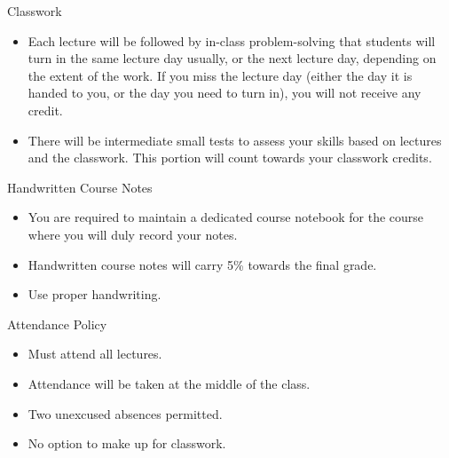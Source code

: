 \documentclass[aspectratio=169,xcolor=dvipsnames,svgnames,x11names,fleqn]{beamer}
\begin{document}
\begin{frame}{Classwork}

\begin{itemize}
\item Each lecture will be followed by in-class problem-solving that students will turn in the same lecture day usually, or the next lecture day, depending on the extent of the work. If you miss the lecture day (either the day it is handed to you, or the day you need to turn in), you will not receive any credit.

\item There will be intermediate small tests to assess your skills based on lectures and the classwork. This portion will count towards your classwork credits.
\end{itemize}



\end{frame}

\begin{frame}{Handwritten Course Notes}

\begin{itemize}
\item You are required to maintain a dedicated course notebook for the course where you will duly record your notes.
\item Handwritten course notes will carry 5\% towards the final grade.

\item Use proper handwriting.

\end{itemize}

\end{frame}

\begin{frame}{Attendance Policy}

\begin{itemize}
\item Must attend all lectures.
\item Attendance will be taken at the middle of the class.
\item Two unexcused absences permitted.
\item No option to make up for classwork.
\end{itemize}

\end{frame}
\end{document}

